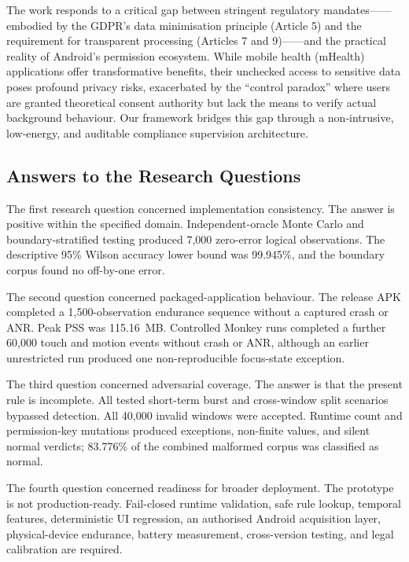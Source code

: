 The work responds to a critical gap between stringent regulatory mandates——embodied by the GDPR's data minimisation principle (Article 5) and the requirement for transparent processing (Articles 7 and 9)——and the practical reality of Android's permission ecosystem. While mobile health (mHealth) applications offer transformative benefits, their unchecked access to sensitive data poses profound privacy risks, exacerbated by the ``control paradox'' where users are granted theoretical consent authority but lack the means to verify actual background behaviour. Our framework bridges this gap through a non‑intrusive, low‑energy, and auditable compliance supervision architecture.

\subsection{Answers to the Research Questions}

The first research question concerned implementation consistency. The answer is positive within the specified domain. Independent-oracle Monte Carlo and boundary-stratified testing produced 7,000 zero-error logical observations. The descriptive 95\% Wilson accuracy lower bound was 99.945\%, and the boundary corpus found no off-by-one error.

The second question concerned packaged-application behaviour. The release APK completed a 1,500-observation endurance sequence without a captured crash or ANR. Peak PSS was 115.16~MB. Controlled Monkey runs completed a further 60,000 touch and motion events without crash or ANR, although an earlier unrestricted run produced one non-reproducible focus-state exception.

The third question concerned adversarial coverage. The answer is that the present rule is incomplete. All tested short-term burst and cross-window split scenarios bypassed detection. All 40,000 invalid windows were accepted. Runtime count and permission-key mutations produced exceptions, non-finite values, and silent normal verdicts; 83.776\% of the combined malformed corpus was classified as normal.

The fourth question concerned readiness for broader deployment. The prototype is not production-ready. Fail-closed runtime validation, safe rule lookup, temporal features, deterministic UI regression, an authorised Android acquisition layer, physical-device endurance, battery measurement, cross-version testing, and legal calibration are required.

